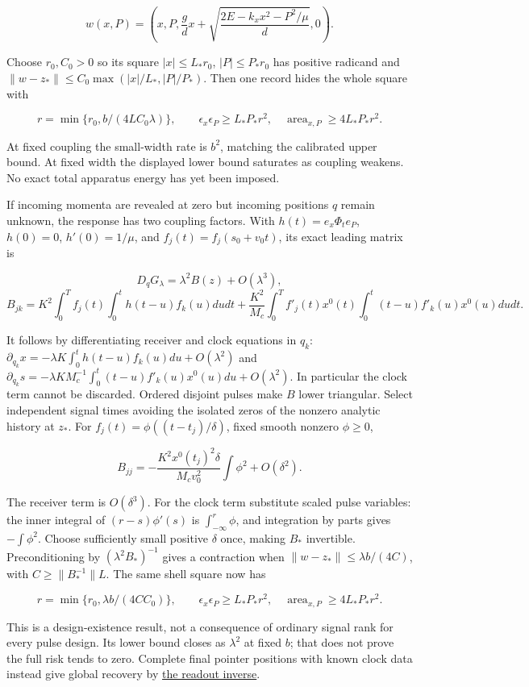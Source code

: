 \documentclass[11pt,a4paper]{article}
\begin{document}
\[w(x,P)=\left(x,P,\frac gd x+
 \sqrt{\frac{2E-k_xx^2-P^2/\mu}{d}},0\right).\]

Choose \(r_0,C_0>0\) so its square \(|x|\le L_*r_0\), \(|P|\le P_*r_0\)
has positive radicand and \(\|w-z_*\|\le C_0\max(|x|/L_*,|P|/P_*)\).
Then one record hides the whole square with

\[r=\min\{r_0,b/(4LC_0\lambda)\},\qquad
\epsilon_x\epsilon_P\ge L_*P_*r^2,\quad
\operatorname{area}_{x,P}\ge4L_*P_*r^2.\]

At fixed coupling the small-width rate is \(b^2\), matching the
calibrated upper bound. At fixed width the displayed lower bound
saturates as coupling weakens. No exact total apparatus energy has yet
been imposed.

If incoming momenta are revealed at zero but incoming positions \(q\)
remain unknown, the response has two coupling factors. With
\(h(t)=e_x\Phi_te_P\), \(h(0)=0\), \(h'(0)=1/\mu\), and
\(f_j(t)=f_j(s_0+v_0t)\), its exact leading matrix is

\[D_qG_\lambda=\lambda^2B(z)+O(\lambda^3),\]
\[B_{jk}=K^2\int_0^T f_j(t)\int_0^t h(t-u)f_k(u)dudt
 +\frac{K^2}{M_c}\int_0^T f'_j(t)x^0(t)
   \int_0^t(t-u)f'_k(u)x^0(u)dudt.\]

It follows by differentiating receiver and clock equations in \(q_k\):
\(\partial_{q_k}x=-\lambda K\int_0^t h(t-u)f_k(u)du+O(\lambda^2)\) and
\(\partial_{q_k}s=-\lambda K M_c^{-1}\int_0^t(t-u)f'_k(u)x^0(u)du+ O(\lambda^2)\).
In particular the clock term cannot be discarded. Ordered disjoint
pulses make \(B\) lower triangular. Select independent signal times
avoiding the isolated zeros of the nonzero analytic history at \(z_*\).
For \(f_j(t)=\phi((t-t_j)/\delta)\), fixed smooth nonzero \(\phi\ge0\),

\[B_{jj}=-\frac{K^2x^0(t_j)^2\delta}{M_cv_0^2}\int\phi^2
 +O(\delta^2).\]

The receiver term is \(O(\delta^3)\). For the clock term substitute
scaled pulse variables: the inner integral of \((r-s)\phi'(s)\) is
\(\int_{-\infty}^r\phi\), and integration by parts gives
\(-\int\phi^2\). Choose sufficiently small positive \(\delta\) once,
making \(B_*\) invertible. Preconditioning by \((\lambda^2B_*)^{-1}\)
gives a contraction when \(\|w-z_*\|\le\lambda b/(4C)\), with
\(C\ge\|B_*^{-1}\|L\). The same shell square now has

\[r=\min\{r_0,\lambda b/(4CC_0)\},\qquad
\epsilon_x\epsilon_P\ge L_*P_*r^2,\quad
\operatorname{area}_{x,P}\ge4L_*P_*r^2.\]

This is a design-existence result, not a consequence of ordinary signal
rank for every pulse design. Its lower bound closes as \(\lambda^2\) at
fixed \(b\); that does not prove the full risk tends to zero. Complete
final pointer positions with known clock data instead give global
recovery by
\href{autonomous-finite-readout.md\#complete-records-replace-clock-preparation-data}{the
readout inverse}.
\end{document}
